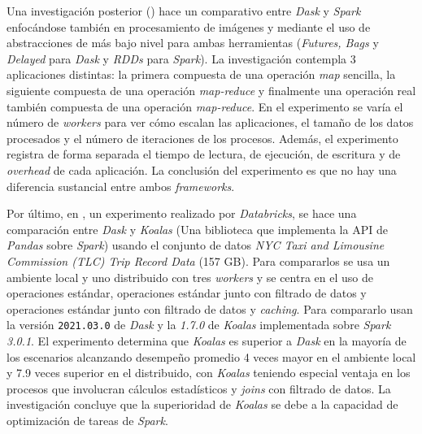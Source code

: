 Una investigación posterior (\cite{dask-spark-neuroimaging}) hace un comparativo entre \textit{Dask} y \textit{Spark} enfocándose también en procesamiento de imágenes y mediante el uso de abstracciones de más bajo nivel para ambas herramientas (\textit{Futures, Bags} y \textit{Delayed} para \textit{Dask} y \textit{RDDs} para \textit{Spark}). La investigación contempla 3 aplicaciones distintas: la primera compuesta de una operación \textit{map} sencilla, la siguiente compuesta de una operación \textit{map-reduce} y finalmente una operación real también compuesta de una operación \textit{map-reduce}. En el experimento se varía el número de \textit{workers} para ver cómo escalan las aplicaciones, el tamaño de los datos procesados y el número de iteraciones de los procesos. Además, el experimento registra de forma separada el tiempo de lectura, de ejecución, de escritura y de \textit{overhead} de cada aplicación. La conclusión del experimento es que no hay una diferencia sustancial entre ambos \textit{frameworks}.

Por último, en \cite{koalas-dask}, un experimento realizado por \textit{Databricks}, se hace una comparación entre \textit{Dask} y \textit{Koalas} (Una biblioteca que implementa la API de \textit{Pandas} sobre \textit{Spark}) usando el conjunto de datos \textit{NYC Taxi and Limousine Commission (TLC) Trip Record Data} (157 GB). Para compararlos se usa un ambiente local y uno distribuido con tres \textit{workers} y se centra en el uso de operaciones estándar, operaciones estándar junto con filtrado de datos y operaciones estándar junto con filtrado de datos y \textit{caching}. Para compararlo usan la versión \texttt{2021.03.0} de \textit{Dask} y la \textit{1.7.0} de \textit{Koalas} implementada sobre \textit{Spark 3.0.1}. El experimento determina que \textit{Koalas} es superior a \textit{Dask} en la mayoría de los escenarios alcanzando desempeño promedio 4 veces mayor en el ambiente local y 7.9 veces superior en el distribuido, con \textit{Koalas} teniendo especial ventaja en los procesos que involucran cálculos estadísticos y \textit{joins} con filtrado de datos. La investigación concluye que la superioridad de \textit{Koalas} se debe a la capacidad de optimización de tareas de \textit{Spark}.

\newpage

